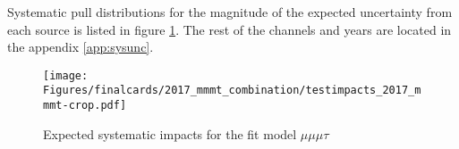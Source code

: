 Systematic pull distributions for the magnitude of the expected uncertainty from each source is listed in figure \ref{fig:impacts_2017_mmmt}. The rest of the channels and years are located in the appendix \ref{app:sysunc}.

\begin{figure}[ht!b]
    \centering 
\texttt{[image: Figures/finalcards/2017\_mmmt\_combination/testimpacts\_2017\_mmmt-crop.pdf]}
    \caption{\label{fig:impacts_2017_mmmt} Expected systematic impacts for the fit model $\mu\mu\mu\tau$}
\end{figure}




